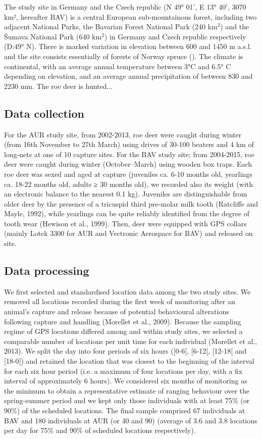 \documentclass[a4paper,11pt]{article}
\newcommand{\species}[1]{(\xmakefirstuc{\emph{#1}})}
\begin{document}
The study site in Germany and the Czech republic (N 49° 01', E 13° 40',
3070 km², hereafter BAV) is a central European sub-mountainous forest,
including two adjacent National Parks, the Bavarian Forest National
Park (240 km$^2$) and the Šumava National Park (640 km$^2$) in Germany and
Czech republic respectively (D:49° N). There is marked variation in
elevation between 600 and 1450 m a.s.l. and the site consists
essentially of forests of Norway spruce \species{picea abies L.}. The climate
is continental, with an average annual temperature between 3°C and
6.5° C depending on elevation, and an average annual precipitation of
between 830 and 2230 mm. The roe deer is hunted...

\subsection*{Data collection}
For the AUR study site, from 2002-2013, roe deer were caught during
winter (from 16th November to 27th March) using drives of 30-100
beaters and 4 km of long-nets at one of 10 capture sites. For the BAV
study site; from 2004-2015, roe deer were caught during winter
(October–March) using wooden box traps. Each roe deer was sexed and
aged at capture (juveniles ca. 6-10 months old, yearlings ca. 18-22
months old, adults ≥ 30 months old), we recorded also its weight (with
an electronic balance to the nearest 0.1 kg). Juveniles are
distinguishable from older deer by the presence of a tricuspid third
pre-molar milk tooth (Ratcliffe and Mayle, 1992), while yearlings can
be quite reliably identified from the degree of tooth wear (Hewison et
al., 1999). Then, deer were equipped with GPS collars (mainly Lotek
3300 for AUR and Vectronic Aerospace for BAV) and released on site.

\subsection*{Data processing}
We first selected and standardised location data among the two study
sites. We removed all locations recorded during the first week of
monitoring after an animal’s capture and release because of potential
behavioural alterations following capture and handling (Morellet et
al., 2009). Because the sampling regime of GPS locations differed
among and within study sites, we selected a comparable number of
locations per unit time for each individual (Morellet et al.,
2013). We split the day into four periods of six hours ([0-6[, [6-12[,
[12-18[ and [18-0[) and retained the location that was closest to the
beginning of the interval for each six hour period (i.e. a maximum of
four locations per day, with a fix interval of approximately 6
hours). We considered six months of monitoring as the minimum to
obtain a representative estimate of ranging behaviour over the
spring-summer period and we kept only those individuals with at least
75\% (or 90\%) of the scheduled locations. The final sample comprised
67 individuals at BAV and 180 individuals at AUR (or 40 and 90)
(average of 3.6 and 3.8 locations per day for 75\% and 90\% of
scheduled locations respectively).
\end{document}
